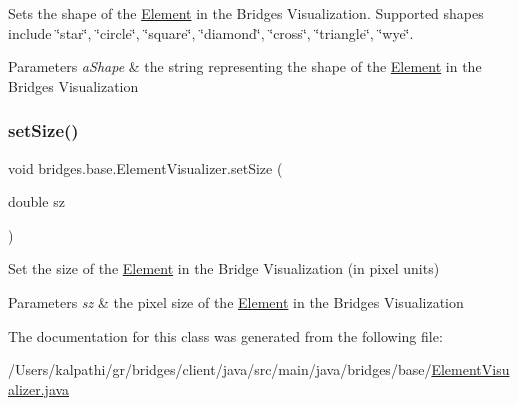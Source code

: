 Sets the shape of the \mbox{\hyperlink{classbridges_1_1base_1_1_element}{Element}} in the Bridges Visualization. Supported shapes include \char`\"{}star\char`\"{}, \char`\"{}circle\char`\"{}, \char`\"{}square\char`\"{}, \char`\"{}diamond\char`\"{}, \char`\"{}cross\char`\"{}, \char`\"{}triangle\char`\"{}, \char`\"{}wye\char`\"{}.


\begin{DoxyParams}{Parameters}
{\em a\+Shape} & the string representing the shape of the \mbox{\hyperlink{classbridges_1_1base_1_1_element}{Element}} in the Bridges Visualization \\
\hline
\end{DoxyParams}
\mbox{\label{classbridges_1_1base_1_1_element_visualizer_aba410184f7df495594fc1fa7948335a5}} 
\subsubsection{\texorpdfstring{set\+Size()}{setSize()}}
{\footnotesize\ttfamily void bridges.\+base.\+Element\+Visualizer.\+set\+Size (\begin{DoxyParamCaption}\item[{double}]{sz }\end{DoxyParamCaption})}

Set the size of the \mbox{\hyperlink{classbridges_1_1base_1_1_element}{Element}} in the Bridge Visualization (in pixel units)


\begin{DoxyParams}{Parameters}
{\em sz} & the pixel size of the \mbox{\hyperlink{classbridges_1_1base_1_1_element}{Element}} in the Bridges Visualization \\
\hline
\end{DoxyParams}


The documentation for this class was generated from the following file\+:\begin{DoxyCompactItemize}
\item 
/\+Users/kalpathi/gr/bridges/client/java/src/main/java/bridges/base/\mbox{\hyperlink{_element_visualizer_8java}{Element\+Visualizer.\+java}}\end{DoxyCompactItemize}
